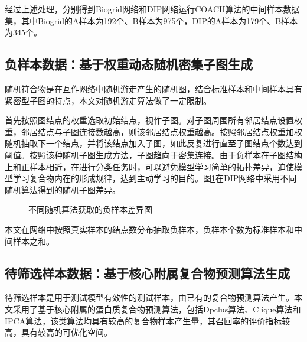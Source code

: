 经过上述处理，分别得到Biogrid网络和DIP网络运行COACH算法的中间样本数据集，其中Biogrid的A样本为192个、B样本为975个，DIP的A样本为179个、B样本为345个。

\subsection{负样本数据：基于权重动态随机密集子图生成}
\label{subsection:allSample:negtiveSampleData}


随机符合物是在互作网络中随机游走产生的随机图，结合标准样本和中间样本具有紧密型子图的特点，本文对随机游走算法做了一定限制。

首先按照图结点的权重选取初始结点，视作子图。对子图周围所有邻居结点设置权重，邻居结点与子图连接数越高，则该邻居结点权重越高。按照邻居结点权重加权随机抽取下一个结点，并将该结点加入子图，如此反复进行直至子图结点个数达到阈值。按照该种随机子图生成方法，子图趋向于密集连接。由于负样本在子图结构上和正样本相近，在进行分类任务时，可以避免模型学习简单的拓扑差异，迫使模型学习复合物内在的形成规律，达到主动学习的目的。图\ref{fig:diffrent-random-garphs}在DIP网络中采用不同随机算法得到的随机子图差异。

\begin{figure}[htbp]
    \centering
    \vskip0.5cm
    \caption{不同随机算法获取的负样本差异图}
    \label{fig:diffrent-random-garphs}
\end{figure}


本文在网络中按照真实样本的结点数分布抽取负样本，负样本个数为标准样本和中间样本之和。

\subsection{待筛选样本数据：基于核心附属复合物预测算法生成}
\label{subsection:allSample:coreAttachSampleData}

待筛选样本是用于测试模型有效性的测试样本，由已有的复合物预测算法产生。本文采用了基于核心附属的蛋白质复合物预测算法，包括Dpclus算法、Clique算法和IPCA算法，该类算法均具有较高的复合物样本产生量，其召回率的评价指标较高，具有较高的可优化空间。

